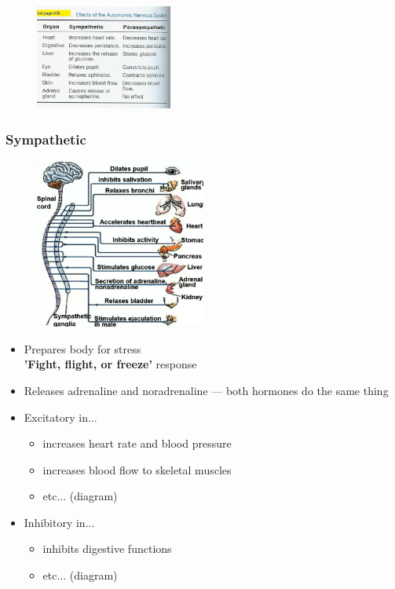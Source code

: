 \documentclass[a4paper,12pt]{article}
\begin{document}
\begin{figure}[H]
    \centering
    \includegraphics[width=0.40\textwidth]{symandpara}
\end{figure}

\subsubsection{Sympathetic}
\begin{figure}[H]
    \centering
    \includegraphics[width=0.50\textwidth]{sympathetic}
\end{figure}
\begin{itemize}
    \item{Prepares body for stress \\ \textbf{'Fight, flight, or freeze'} response}
    \item{Releases adrenaline and noradrenaline --- both hormones do the same thing}
    \item{
            Excitatory in...
            \begin{itemize}
                \item{increases heart rate and blood pressure}
                \item{increases blood flow to skeletal muscles}
                \item{etc... (diagram)}
            \end{itemize}
        }
    \item{
            Inhibitory in...
            \begin{itemize}
                \item{inhibits digestive functions}
                \item{etc... (diagram)}
            \end{itemize}
        }
\end{itemize}
\end{document}
